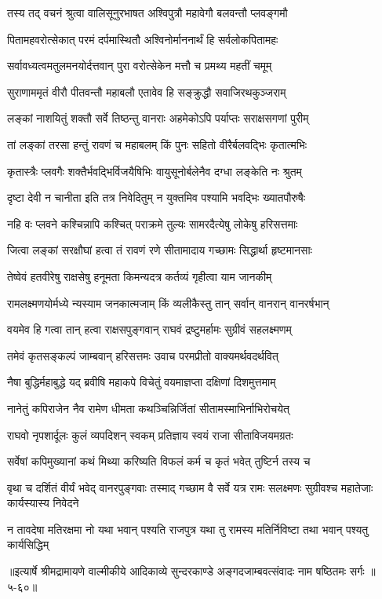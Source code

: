 
\twolineshloka
{तस्य तद् वचनं श्रुत्वा वालिसूनुरभाषत}
{अश्विपुत्रौ महावेगौ बलवन्तौ प्लवङ्गमौ} %

\twolineshloka
{पितामहवरोत्सेकात् परमं दर्पमास्थितौ}
{अश्विनोर्माननार्थं हि सर्वलोकपितामहः} %

\twolineshloka
{सर्वावध्यत्वमतुलमनयोर्दत्तवान् पुरा}
{वरोत्सेकेन मत्तौ च प्रमथ्य महतीं चमूम्} %

\twolineshloka
{सुराणाममृतं वीरौ पीतवन्तौ महाबलौ}
{एतावेव हि सङ्क्रुद्धौ सवाजिरथकुञ्जराम्} %

\twolineshloka
{लङ्कां नाशयितुं शक्तौ सर्वे तिष्ठन्तु वानराः}
{अहमेकोऽपि पर्याप्तः सराक्षसगणां पुरीम्} %

\twolineshloka
{तां लङ्कां तरसा हन्तुं रावणं च महाबलम्}
{किं पुनः सहितो वीरैर्बलवद्भिः कृतात्मभिः} %

\twolineshloka
{कृतास्त्रैः प्लवगैः शक्तैर्भवद्भिर्विजयैषिभिः}
{वायुसूनोर्बलेनैव दग्धा लङ्केति नः श्रुतम्} %

\twolineshloka
{दृष्टा देवी न चानीता इति तत्र निवेदितुम्}
{न युक्तमिव पश्यामि भवद्भिः ख्यातपौरुषैः} %

\twolineshloka
{नहि वः प्लवने कश्चिन्नापि कश्चित् पराक्रमे}
{तुल्यः सामरदैत्येषु लोकेषु हरिसत्तमाः} %

\twolineshloka
{जित्वा लङ्कां सरक्षौघां हत्वा तं रावणं रणे}
{सीतामादाय गच्छामः सिद्धार्था हृष्टमानसाः} %

\twolineshloka
{तेष्वेवं हतवीरेषु राक्षसेषु हनूमता}
{किमन्यदत्र कर्तव्यं गृहीत्वा याम जानकीम्} %

\twolineshloka
{रामलक्ष्मणयोर्मध्ये न्यस्याम जनकात्मजाम्}
{किं व्यलीकैस्तु तान् सर्वान् वानरान् वानरर्षभान्} %

\twolineshloka
{वयमेव हि गत्वा तान् हत्वा राक्षसपुङ्गवान्}
{राघवं द्रष्टुमर्हामः सुग्रीवं सहलक्ष्मणम्} %

\twolineshloka
{तमेवं कृतसङ्कल्पं जाम्बवान् हरिसत्तमः}
{उवाच परमप्रीतो वाक्यमर्थवदर्थवित्} %

\twolineshloka
{नैषा बुद्धिर्महाबुद्धे यद् ब्रवीषि महाकपे}
{विचेतुं वयमाज्ञप्ता दक्षिणां दिशमुत्तमाम्} %

\twolineshloka
{नानेतुं कपिराजेन नैव रामेण धीमता}
{कथञ्चिन्निर्जितां सीतामस्माभिर्नाभिरोचयेत्} %

\twolineshloka
{राघवो नृपशार्दूलः कुलं व्यपदिशन् स्वकम्}
{प्रतिज्ञाय स्वयं राजा सीताविजयमग्रतः} %

\twolineshloka
{सर्वेषां कपिमुख्यानां कथं मिथ्या करिष्यति}
{विफलं कर्म च कृतं भवेत् तुष्टिर्न तस्य च} %

\threelineshloka
{वृथा च दर्शितं वीर्यं भवेद् वानरपुङ्गवाः}
{तस्माद् गच्छाम वै सर्वे यत्र रामः सलक्ष्मणः}
{सुग्रीवश्च महातेजाः कार्यस्यास्य निवेदने} %

\twolineshloka
{न तावदेषा मतिरक्षमा नो यथा भवान् पश्यति राजपुत्र}
{यथा तु रामस्य मतिर्निविष्टा तथा भवान् पश्यतु कार्यसिद्धिम्} %


॥इत्यार्षे श्रीमद्रामायणे वाल्मीकीये आदिकाव्ये सुन्दरकाण्डे अङ्गदजाम्बवत्संवादः नाम षष्ठितमः सर्गः ॥५-६०॥
